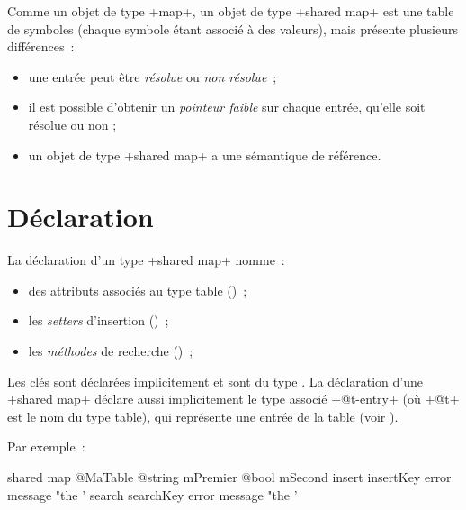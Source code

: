 

Comme un objet de type  \ggs+map+, un objet de type \ggs+shared map+ est une table de symboles (chaque symbole étant associé à des valeurs), mais présente plusieurs différences~:
\begin{itemize}
  \item une entrée peut être \emph{résolue} ou \emph{non résolue}~;
  \item il est possible d'obtenir un \emph{pointeur faible} sur chaque entrée, qu'elle soit résolue ou non ;
  \item un objet de type \ggs+shared map+ a une sémantique de référence.
\end{itemize}



\section{Déclaration}

La déclaration d'un type \ggs+shared map+ nomme~:
\begin{itemize}
  \item des attributs associés au type table ()~;
  \item les \emph{setters} d'insertion ()~;
  \item les \emph{méthodes} de recherche ()~;
\end{itemize}

Les clés sont déclarées implicitement et sont du type . La déclaration d'une \ggs+shared map+ déclare aussi implicitement le type associé \ggs+@t-entry+ (où \ggs+@t+ est le nom du type table), qui représente une entrée de la table (voir ).

Par exemple~:

\begin{galgas}
shared map @MaTable {
  @string mPremier
  @bool mSecond
  insert insertKey error message "the '%
  search searchKey error message "the '%
}
\end{galgas}

